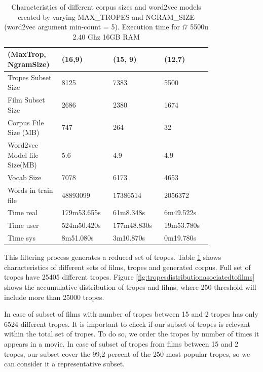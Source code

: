 \documentclass[letterpaper]{article}
\begin{document}
\begin{table}[t]
	\centering
	\begin{tabular}{|p{0.20\linewidth}|p{0.2\linewidth}|p{0.2\linewidth}|p{0.2\linewidth}|}
		\hline
		\textbf{(MaxTrop, NgramSize)}& \textbf{(16,9)} & \textbf{(15, 9)} & \textbf{(12,7)}\\
		\hline
		\hline
		Tropes Subset Size&8125&7383& 5500\\
		\hline
		Film Subset Size&2686&2380& 1674\\
		\hline
		Corpus File Size (MB)&747&264& 32\\
		\hline
	    Word2vec Model file Size(MB)&5.6&4.9&4.9\\
		\hline
		Vocab Size& 7078 & 6173 & 4653\\
		\hline
		Words in train file& 48893099 &17386514&2056372\\
		\hline
		Time real&179m53.655s&61m8.348s&6m49.522s\\
        \hline
		Time user&524m50.420s&177m48.830s&19m53.780s\\
		\hline
	    Time sys&8m51.080s&3m10.870s&0m19.780s\\
		\hline
		
	\end{tabular}
	\caption{Characteristics of different corpus sizes and word2vec models created by varying MAX\_TROPES and NGRAM\_SIZE (word2vec argument min-count = 5). Execution time for i7 5500u 2.40 Ghz 16GB RAM}
	\label{tab:corpusSize}
\end{table}
	
	
	This filtering process generates a reduced set of tropes. Table \ref{tab:corpusSize} shows characteristics of different sets of films, tropes and generated corpus. Full set of tropes have 25405 different tropes. Figure \ref{fig:tropesdistributionasociatedtofilms} shows the accumulative distribution of tropes and films, where 250 threshold will include more than 25000 tropes. 
	
	In case of subset of films with number of tropes between 15 and 2 tropes has only 6524 different tropes. 
    It is important to check if our subset of tropes is relevant within the total set of tropes. To do so, we order the tropes by number of times it appears in a movie. In case of subset of tropes from films between 15 and 2 tropes, our subset cover the 99,2 percent of the 250 most popular tropes, so we can consider it a representative subset. 
	
\end{document}
